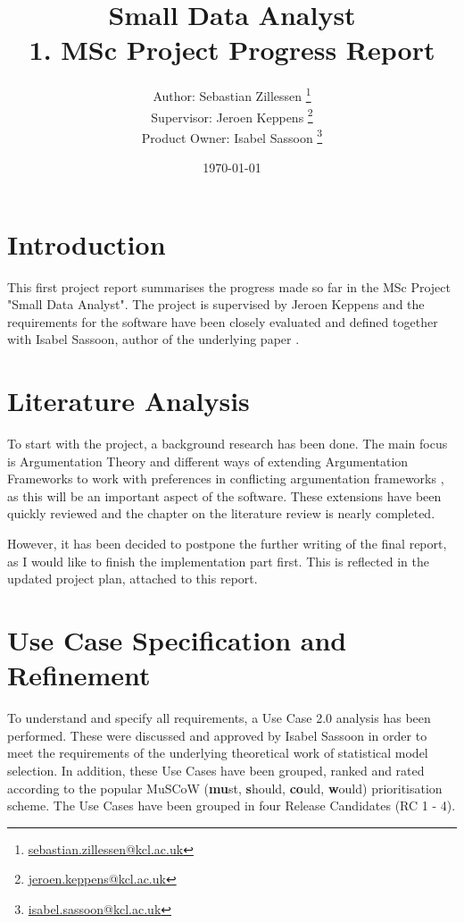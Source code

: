 \documentclass[11pt,twocolumn]{article}
\begin{document}
\title{
Small Data Analyst 
\protect\\ 
1. MSc Project Progress Report
}
\author{
Author:  \hfill Sebastian Zillessen \thanks{\href{mailto:sebastian.zillessen@kcl.ac.uk}{sebastian.zillessen@kcl.ac.uk}}\\
Supervisor: \hfill Jeroen Keppens \thanks{\href{mailto:jeroen.keppens@kcl.ac.uk}{jeroen.keppens@kcl.ac.uk}}\\
Product Owner: \hfill Isabel Sassoon \thanks{\href{mailto:isabel.sassoon@kcl.ac.uk}{isabel.sassoon@kcl.ac.uk}}
}
\date{\today}
\maketitle


\section{Introduction}
This first project report summarises the progress made so far in the MSc Project "Small Data Analyst". The project is supervised by Jeroen \mbox{Keppens} and the requirements for the software have been closely evaluated and defined together with Isabel Sassoon, author of the underlying paper \cite{sassoon2014}. 

\section{ Literature Analysis}
To start with the project, a background research has been done. The main focus is Argumentation Theory \cite{dung1995} and different ways of extending Argumentation Frameworks to work with preferences in conflicting argumentation frameworks \cite{Modgil2009,amgoud,amgoud1998,pollock1987}, as this will be an important aspect of the software. These extensions have been quickly reviewed and the chapter on the literature review is nearly completed.

However, it has been decided to postpone the further writing of the final report, as I would like to finish the implementation part first. This is reflected in the updated project plan, attached to this report.

\section{ Use Case Specification and Refinement}

To understand and specify all requirements, a Use Case 2.0 \cite{jacobson2011usecase} analysis has been performed. These were discussed and approved by Isabel Sassoon in order to meet the requirements of the underlying theoretical work of statistical model selection. In addition, these Use Cases have been grouped, ranked and rated according to the popular MuSCoW (\textbf{mu}st, \textbf{s}hould, \textbf{co}uld, \textbf{w}ould) prioritisation scheme. The Use Cases have been grouped in four Release Candidates (RC 1 - 4). 
\end{document}
